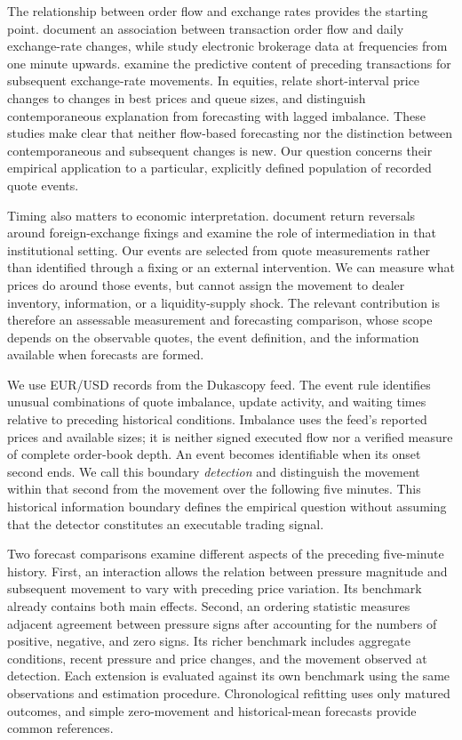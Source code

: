 \documentclass[12pt,letterpaper]{article}
\begin{document}
The relationship between order flow and exchange rates provides the starting point. \citet{evans2002order} document an association between transaction order flow and daily exchange-rate changes, while \citet{berger2008order} study electronic brokerage data at frequencies from one minute upwards. \citet{ito2006price} examine the predictive content of preceding transactions for subsequent exchange-rate movements. In equities, \citet{cont2014price} relate short-interval price changes to changes in best prices and queue sizes, and \citet{cont2023cross} distinguish contemporaneous explanation from forecasting with lagged imbalance. These studies make clear that neither flow-based forecasting nor the distinction between contemporaneous and subsequent changes is new. Our question concerns their empirical application to a particular, explicitly defined population of recorded quote events.

Timing also matters to economic interpretation. \citet{krohn2024foreign} document return reversals around foreign-exchange fixings and examine the role of intermediation in that institutional setting. Our events are selected from quote measurements rather than identified through a fixing or an external intervention. We can measure what prices do around those events, but cannot assign the movement to dealer inventory, information, or a liquidity-supply shock. The relevant contribution is therefore an assessable measurement and forecasting comparison, whose scope depends on the observable quotes, the event definition, and the information available when forecasts are formed.

We use EUR/USD records from the Dukascopy feed. The event rule identifies unusual combinations of quote imbalance, update activity, and waiting times relative to preceding historical conditions. Imbalance uses the feed's reported prices and available sizes; it is neither signed executed flow nor a verified measure of complete order-book depth. An event becomes identifiable when its onset second ends. We call this boundary \emph{detection} and distinguish the movement within that second from the movement over the following five minutes. This historical information boundary defines the empirical question without assuming that the detector constitutes an executable trading signal.

Two forecast comparisons examine different aspects of the preceding five-minute history. First, an interaction allows the relation between pressure magnitude and subsequent movement to vary with preceding price variation. Its benchmark already contains both main effects. Second, an ordering statistic measures adjacent agreement between pressure signs after accounting for the numbers of positive, negative, and zero signs. Its richer benchmark includes aggregate conditions, recent pressure and price changes, and the movement observed at detection. Each extension is evaluated against its own benchmark using the same observations and estimation procedure. Chronological refitting uses only matured outcomes, and simple zero-movement and historical-mean forecasts provide common references.
\end{document}
